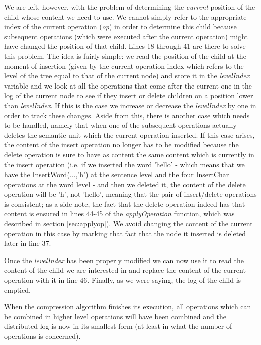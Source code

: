 We are left, however, with the problem of determining the \emph{current} position of the child whose
content we need to use. We cannot simply refer to the appropriate index of the current operation
(\emph{op}) in order to determine this child because subsequent operations (which were executed after
the current operation) might have changed the position of that child. Lines 18 through 41 are there
to solve this problem. The idea is fairly simple: we read the position of the child at the moment of
insertion (given by the current operation index which refers to the level of the tree equal to that
of the current node) and store it in the \emph{levelIndex} variable and we look at all the operations
that come after the current one in the log of the current node to see if they insert or delete
children on a position lower than \emph{levelIndex}. If this is the case we increase or decrease the
\emph{levelIndex} by one in order to track these changes. Aside from this, there is another case which
needs to be handled, namely that when one of the subsequent operations actually deletes the semantic
unit which the current operation inserted. If this case arises, the content of the insert operation
no longer has to be modified because the delete operation is sure to have as content the same content
which is currently in the insert operation (i.e. if we inserted the word 'hello' - which means that
we have the InsertWord(...,'h') at the sentence level and the four InsertChar operations at the word level -
and then we deleted it, the content of the delete operation will be 'h', not 'hello', meaning that
the pair of insert/delete operations is consistent; as a side note, the fact that the delete operation
indeed has that content is ensured in lines 44-45 of the \emph{applyOperation} function, which was
described in section \ref{sec:applyop}). We avoid changing the content of the current operation in this
case by marking that fact that the node it inserted is deleted later in line 37.

Once the \emph{levelIndex} has been properly modified we can now use it to read the content of the
child we are interested in and replace the content of the current operation with it in line 46. Finally,
as we were saying, the log of the child is emptied.

When the compression algorithm finishes its execution, all operations which can be combined in higher
level operations will have been combined and the distributed log is now in its smallest form (at least
in what the number of operations is concerned).


